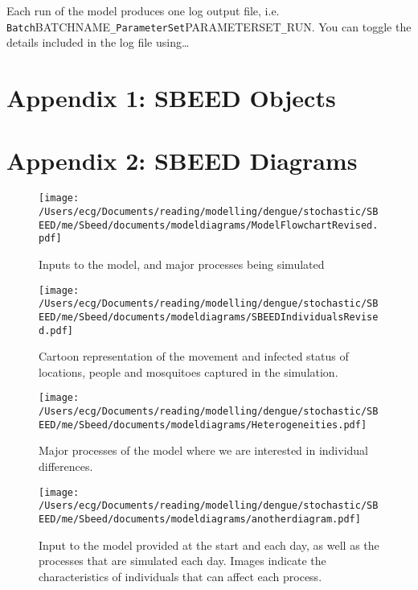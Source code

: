 \documentclass[11pt]{article}
\newcommand{\linecmd}[1]{\texttt{#1}}
\begin{document}
Each run of the model produces one log output file, i.e. \newline{}\linecmd{Batch}BATCHNAME\linecmd{\_ParameterSet}PARAMETERSET\linecmd{\_}RUN. You can toggle the details included in the log file using\dots %

\newpage{}



\newpage{}

\section*{Appendix 1: SBEED Objects} %

\newpage{}
\section*{Appendix 2: SBEED Diagrams}
\smallskip{}
 \begin{figure}[h]\texttt{[image: /Users/ecg/Documents/reading/modelling/dengue/stochastic/SBEED/me/Sbeed/documents/modeldiagrams/ModelFlowchartRevised.pdf]}\caption{Inputs to the model, and major processes being simulated}\end{figure}
 \begin{figure}\texttt{[image: /Users/ecg/Documents/reading/modelling/dengue/stochastic/SBEED/me/Sbeed/documents/modeldiagrams/SBEEDIndividualsRevised.pdf]}\caption{Cartoon representation of the movement and infected status of locations, people and mosquitoes captured in the simulation.}\end{figure}
 \begin{figure}\texttt{[image: /Users/ecg/Documents/reading/modelling/dengue/stochastic/SBEED/me/Sbeed/documents/modeldiagrams/Heterogeneities.pdf]}\caption{Major processes of the model where we are interested in individual differences.}\end{figure}
 \begin{figure}\texttt{[image: /Users/ecg/Documents/reading/modelling/dengue/stochastic/SBEED/me/Sbeed/documents/modeldiagrams/anotherdiagram.pdf]}\caption{Input to the model provided at the start and each day, as well as the processes that are simulated each day. Images indicate the characteristics of individuals that can affect each process.}\end{figure}
 
\end{document}
